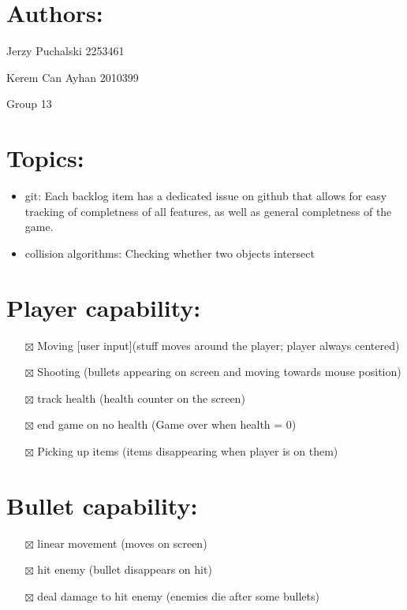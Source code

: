 \documentclass[
]{article}
\author{}
\date{}
\providecommand{\tightlist}{%
  \setlength{\itemsep}{0pt}\setlength{\parskip}{0pt}}
\begin{document}
\section{Authors:}
Jerzy Puchalski 2253461

Kerem Can Ayhan 2010399

Group 13

\section{Topics:}\label{topics}

\begin{itemize}
\tightlist
\item
  git: 
    Each backlog item has a dedicated issue on github that allows for easy tracking of completness of all features, as well as general completness of the game.
\item
  collision algorithms: Checking whether two objects intersect 
\end{itemize}

\section{Player capability:}\label{player-capability}

\begin{itemize}
\tightlist
\item[$\boxtimes$]
  Moving {[}user input{]}(stuff moves around the player; player always
  centered)
\item[$\boxtimes$]
  Shooting (bullets appearing on screen and moving towards mouse
  position)
\item[$\boxtimes$]
  track health (health counter on the screen)
\item[$\boxtimes$]
  end game on no health (Game over when health = 0)
\item[$\boxtimes$]
  Picking up items (items disappearing when player is on them)
\end{itemize}

\section{Bullet capability:}\label{bullet-capability}

\begin{itemize}
\tightlist
\item[$\boxtimes$]
  linear movement (moves on screen)
\item[$\boxtimes$]
  hit enemy (bullet disappears on hit)
\item[$\boxtimes$]
  deal damage to hit enemy (enemies die after some bullets)
\end{itemize}
\end{document}
